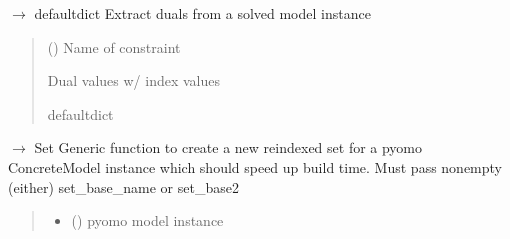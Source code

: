 \documentclass[letterpaper,10pt,english]{sphinxmanual}
\begin{document}
\begin{fulllineitems}
\begin{fulllineitems}
\label{\detokenize{src.common.model:src.common.model.Model.get_duals}}
\pysigstartsignatures
\pysiglinewithargsret
{}
{}
{{ $\rightarrow$ defaultdict}}
\pysigstopsignatures
\sphinxAtStartPar
Extract duals from a solved model instance
\begin{quote}\begin{description}
\sphinxAtStartPar
{} () \textendash{} Name of constraint

\sphinxAtStartPar
Dual values w/ index values

\sphinxAtStartPar
defaultdict

\end{description}\end{quote}

\end{fulllineitems}


\begin{fulllineitems}
\label{\detokenize{src.common.model:src.common.model.Model.populate_sets_rule}}
\pysigstartsignatures
\pysiglinewithargsret
{}
{\sphinxparamcomma {}\sphinxparamcomma {}}
{{ $\rightarrow$ Set}}
\pysigstopsignatures
\sphinxAtStartPar
Generic function to create a new re\sphinxhyphen{}indexed set for a pyomo ConcreteModel instance which
should speed up build time. Must pass non\sphinxhyphen{}empty (either) set\_base\_name or set\_base2
\begin{quote}\begin{description}
\begin{itemize}
\item {} 
\sphinxAtStartPar
{} () \textendash{} pyomo model instance


\end{itemize}
\end{description}
\end{quote}
\end{fulllineitems}
\end{fulllineitems}
\end{document}
